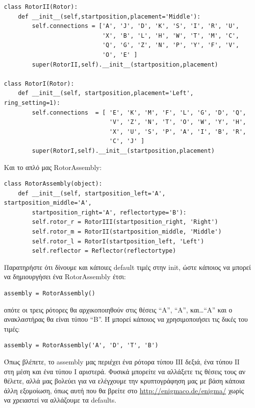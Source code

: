 \documentclass[a4paper,twoside,12pt]{article}
\begin{document}
\small
\begin{verbatim}
class RotorII(Rotor):
    def __init__(self,startposition,placement='Middle'):
        self.connections = ['A', 'J', 'D', 'K', 'S', 'I', 'R', 'U',
                            'X', 'B', 'L', 'H', 'W', 'T', 'M', 'C',
                            'Q', 'G', 'Z', 'N', 'P', 'Y', 'F', 'V',
                            'O', 'E' ]
        super(RotorII,self).__init__(startposition,placement)

class RotorI(Rotor):
    def __init__(self, startposition,placement='Left', ring_setting=1):
        self.connections  = [ 'E', 'K', 'M', 'F', 'L', 'G', 'D', 'Q',
                              'V', 'Z', 'N', 'T', 'O', 'W', 'Y', 'H',
                              'X', 'U', 'S', 'P', 'A', 'I', 'B', 'R',
                              'C', 'J' ]
        super(RotorI,self).__init__(startposition,placement)
\end{verbatim}
\normalsize

Και το απλό μας RotorAssembly:

\small
\begin{verbatim}
class RotorAssembly(object):
    def __init__(self, startposition_left='Α', startposition_middle='Α',
        startposition_right='Α', reflectortype='B'):
        self.rotor_r = RotorIII(startposition_right, 'Right')
        self.rotor_m = RotorII(startposition_middle, 'Middle')
        self.rotor_l = RotorI(startposition_left, 'Left')
        self.reflector = Reflector(reflectortype)
\end{verbatim}
\normalsize

Παρατηρήστε ότι δίνουμε και κάποιες default τιμές στην init, ώστε κάποιος να μπορεί να δημιουργήσει ένα RotorAssembly  έτσι:

\begin{verbatim}
assembly = RotorAssembly()
\end{verbatim}

οπότε οι τρεις ρότορες θα αρχικοποιηθούν στις θέσεις “Α”, “Α”, και\ldots “Α” και ο ανακλαστήρας θα είναι τύπου “B”. Ή μπορεί κάποιος να χρησιμοποιήσει τις δικές του τιμές:

\begin{verbatim}
assembly = RotorAssembly('A', 'D', 'T', 'B')
\end{verbatim}

Όπως βλέπετε, το assembly μας περιέχει ένα ρότορα τύπου ΙΙΙ δεξιά, ένα τύπου ΙΙ στη μέση και ένα τύπου Ι αριστερά.  Φυσικά μπορείτε να αλλάξετε τις θέσεις τους αν θέλετε, αλλά μας βολεύει για να ελέγχουμε την κρυπτογράφηση μας με βάση κάποια άλλη εξομοίωση, όπως αυτή που θα βρείτε στο \url{http://enigmaco.de/enigma/} χωρίς να χρειαστεί να αλλάζουμε τα defaults.
\end{document}
